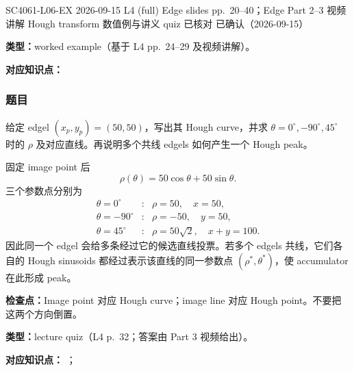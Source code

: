 
\clearpage


\examplemeta
  {SC4061-L06-EX}
  {2026-09-15}
  {L4 (full) Edge slides pp.~20--40；Edge Part 2--3 视频讲解}
  {Hough transform 数值例与讲义 quiz 已核对}
  {已确认（2026-09-15）}


\textbf{类型：}worked example（基于 L4 pp.~24--29 及视频讲解）。

\textbf{对应知识点：}

\subsubsection*{题目}

给定 edgel $(x_p,y_p)=(50,50)$，写出其 Hough curve，并求 $\theta=0^\circ,-90^\circ,45^\circ$ 时的 $\rho$ 及对应直线。再说明多个共线 edgels 如何产生一个 Hough peak。

\begin{checkedsolution}
固定 image point 后
\[
  \rho(\theta)=50\cos\theta+50\sin\theta.
\]
三个参数点分别为
\[
\begin{array}{ccl}
  \theta=0^\circ      &:& \rho=50,\quad x=50,\\
  \theta=-90^\circ    &:& \rho=-50,\quad y=50,\\
  \theta=45^\circ     &:& \rho=50\sqrt2,\quad x+y=100.
\end{array}
\]
因此同一个 edgel 会给多条经过它的候选直线投票。若多个 edgels 共线，它们各自的 Hough sinusoids 都经过表示该直线的同一参数点 $(\rho^*,\theta^*)$，使 accumulator 在此形成 peak。
\end{checkedsolution}

\textbf{检查点：}Image point 对应 Hough curve；image line 对应 Hough point。不要把这两个方向倒置。


\textbf{类型：}lecture quiz（L4 p.~32；答案由 Part 3 视频给出）。

\textbf{对应知识点：}
；

